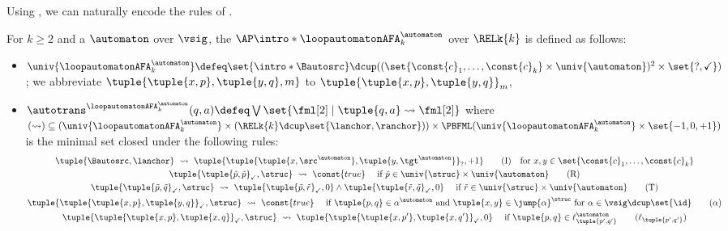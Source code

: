 Using , we can naturally encode the rules of .
\begin{defi}\label{definition: loop-automaton to 2AFA}
    For $k \ge 2$ and a  $\automaton$ over $\vsig$,
    the  $\AP\intro*\loopautomatonAFA_{k}^{\automaton}$ over $\RELk{k}$ is defined as follows:
    \begin{itemize}
        \item \AP $\univ{\loopautomatonAFA_{k}^{\automaton}} \defeq \set{\intro*\Bautosrc} \dcup ((\set{\const{c}_1, \dots, \const{c}_k} \times \univ{\automaton})^2 \times \set{?, \checkmark})$; we abbreviate $\tuple{\tuple{x, p}, \tuple{y, q}, m}$ to $\tuple{\tuple{x, p}, \tuple{y, q}}_{m}$,
        \item $\autotrans^{\loopautomatonAFA_{k}^{\automaton}}(q, a) \defeq \bigvee \set{\fml[2] \mid \tuple{q, a} \leadsto \fml[2]}$ where
        $(\leadsto) \subseteq (\univ{\loopautomatonAFA_{k}^{\automaton}} \times (\RELk{k} \dcup \set{\lanchor,\ranchor}))
        \times \PBFML(\univ{\loopautomatonAFA_{k}^{\automaton}} \times \set{-1, 0, +1})$ is the minimal set closed under the following rules:
        \begin{gather*}
        \tuple{\Bautosrc, \lanchor} ~\leadsto~ \tuple{\tuple{\tuple{x, \src^{\automaton}}, \tuple{y, \tgt^{\automaton}}}_{?}, +1} \tag{I} \quad \text{for $x,y \in \set{\const{c}_1, \dots, \const{c}_k}$}\\
            \tuple{\tuple{\tilde{p}, \tilde{p}}_{\checkmark}, \struc} ~\leadsto~ \const{true} \quad\text{ if $\tilde{p} \in \univ{\struc} \times \univ{\automaton}$} \tag{R}\\
            \tuple{\tuple{\tilde{p}, \tilde{q}}_{\checkmark}, \struc} ~\leadsto~ \tuple{\tuple{\tilde{p}, \tilde{r}}_{\checkmark}, 0} \land \tuple{\tuple{\tilde{r}, \tilde{q}}_{\checkmark}, 0} \quad\text{ if $\tilde{r} \in \univ{\struc} \times \univ{\automaton}$} \tag{T}\\
            \tuple{\tuple{\tuple{x, p}, \tuple{y, q}}_{\checkmark}, \struc} ~\leadsto~ \const{true} \quad\text{ if $\tuple{p, q} \in \alpha^{\automaton} \mbox{ and } \tuple{x, y} \in \jump{\alpha}^{\struc}$ for $\alpha \in \vsig \dcup \set{\id}$} \tag{$\alpha$}\\
            \tuple{\tuple{\tuple{x, p}, \tuple{x, q}}_{\checkmark}, \struc} ~\leadsto~ \tuple{\tuple{\tuple{x, p'}, \tuple{x, q'}}_{\checkmark},0} \quad\text{ if $\tuple{p, q} \in \ell_{\tuple{p', q'}}^{\automaton}$} \tag{$\ell_{\tuple{p', q'}}$}\\

\end{gather*}
\end{itemize}
\end{defi}
